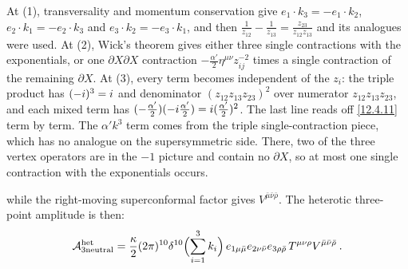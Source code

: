\begin{tcolorbox}[breakable]
\begin{remark}
		At (1), transversality and momentum conservation give $e_{1}\cdot k_{3}=-e_{1}\cdot k_{2}$, $e_{2}\cdot k_{1}=-e_{2}\cdot k_{3}$ and $e_{3}\cdot k_{2}=-e_{3}\cdot k_{1}$, and then $\frac1{z_{12}}-\frac1{z_{13}}=\frac{z_{23}}{z_{12}z_{13}}$ and its analogues were used. At (2), Wick's theorem gives either three single contractions with the exponentials, or one $\partial X\partial X$ contraction $-\frac{\alpha'}{2}\eta^{\mu\nu}z_{ij}^{-2}$ times a single contraction of the remaining $\partial X$. At (3), every term becomes independent of the $z_{i}$: the triple product has $(-i)^{3}=i$ and denominator $(z_{12}z_{13}z_{23})^{2}$ over numerator $z_{12}z_{13}z_{23}$, and each mixed term has $(-\frac{\alpha'}{2})(-i\frac{\alpha'}{2})=i(\frac{\alpha'}{2})^{2}$. The last line reads off \eqref{12.4.11} term by term. The $\alpha'k^{3}$ term comes from the triple single-contraction piece, which has no analogue on the supersymmetric side. There, two of the three vertex operators are in the $-1$ picture and contain no $\partial X$, so at most one single contraction with the exponentials occurs.
	\end{remark}
\end{tcolorbox}
\noindent while the right-moving superconformal factor gives $V^{\bar{\mu}\bar{\nu}\bar{\rho}}$.
The heterotic three-point amplitude is then:
\begin{equation}
	\mathcal{A}_{3\mathrm{neutral}}^{\mathrm{het}} = \frac{\kappa}{2}(2\pi)^{10}\delta^{10}\Bigl(\sum_{i=1}^3 k_{i}\Bigr)\,e_{1\mu\bar{\mu}}e_{2\nu\bar{\nu}}e_{3\rho\bar{\rho}}\,T^{\mu\nu\rho}V^{\bar{\mu}\bar{\nu}\bar{\rho}} \:. \label{12.4.14}
\end{equation}

